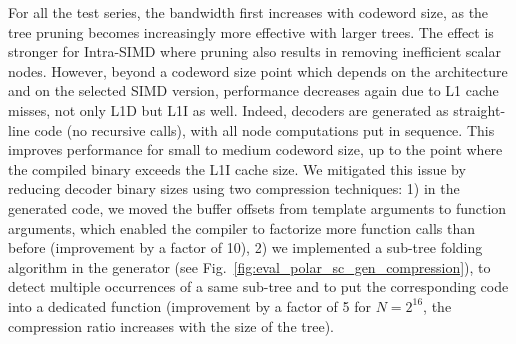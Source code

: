 For all the test series, the bandwidth first increases with codeword size, as
the tree pruning becomes increasingly more effective with larger trees. The
effect is stronger for Intra-SIMD where pruning also results in removing
inefficient scalar nodes. However, beyond a codeword size point which depends on
the architecture and on the selected SIMD version, performance decreases again
due to L1 cache misses, not only L1D but L1I as well. Indeed, decoders are
generated as straight-line code (no recursive calls), with all node computations
put in sequence. This improves performance for small to medium codeword size, up
to the point where the compiled binary exceeds the L1I cache size. We mitigated
this issue by reducing decoder binary sizes using two compression techniques: 1)
in the generated code, we moved the buffer offsets from template arguments to
function arguments, which enabled the compiler to factorize more function calls
than before (improvement by a factor of 10), 2) we implemented a sub-tree
folding algorithm in the generator (see
Fig.~\ref{fig:eval_polar_sc_gen_compression}), to detect multiple occurrences of
a same sub-tree and to put the corresponding code into a dedicated function
(improvement by a factor of 5 for $N=2^{16}$, the compression ratio increases
with the size of the tree).

